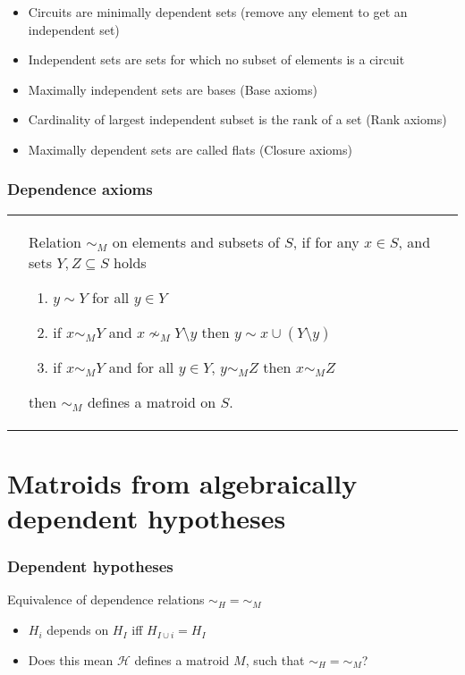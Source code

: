 \documentclass[bigger]{beamer}
\begin{document}
\begin{frame}
  \frametitle{}
  \begin{itemize}
  \item Circuits are minimally dependent sets (remove any element to
    get an independent set)
  \item Independent sets are sets for which no subset of elements is a
    circuit
  \item Maximally independent sets are bases (Base axioms)
  \item Cardinality of largest independent subset is the rank of a set
    (Rank axioms)
  \item Maximally dependent sets are called flats (Closure axioms)
  \end{itemize}
\end{frame}


\begin{frame}
\frametitle{Dependence axioms}

\begin{tabular}{ll}
 \begin{minipage}{.4\textwidth}
   
 \end{minipage} &
 \begin{minipage}{.6\textwidth}
 Relation $\sim_M$ on elements and subsets of $S$,
 if for any $x \in S$, and sets $Y,Z \subseteq S$ holds
 \begin{enumerate}
 \item $y \sim Y$ for all $y \in Y$
 \item if $x \sim_M Y$ and $x \nsim_M Y\setminus y$
   then $y \sim x \cup (Y \setminus y)$
 \item if $x \sim_M Y$ and for all $y \in Y$, $y \sim_M Z$ then $x \sim_M Z$
 \end{enumerate}
 then $\sim_M$ defines a matroid on $S$.
 \end{minipage}
\end{tabular}



\end{frame}

\section{Matroids from algebraically dependent hypotheses}
\begin{frame}
 \frametitle{Dependent hypotheses}
 \begin{block}{Equivalence of dependence relations $\sim_H = \sim_M$}
   \begin{itemize}
   \item<1-> $H_i$ depends on $H_I$ iff $H_{I \cup i} = H_{I}$
   \item<2-> Does this mean $\mathscr{H}$ defines a matroid $M$, such that
     $\sim_H = \sim_M$?
   \end{itemize}
 \end{block}
\end{frame}
\end{document}
